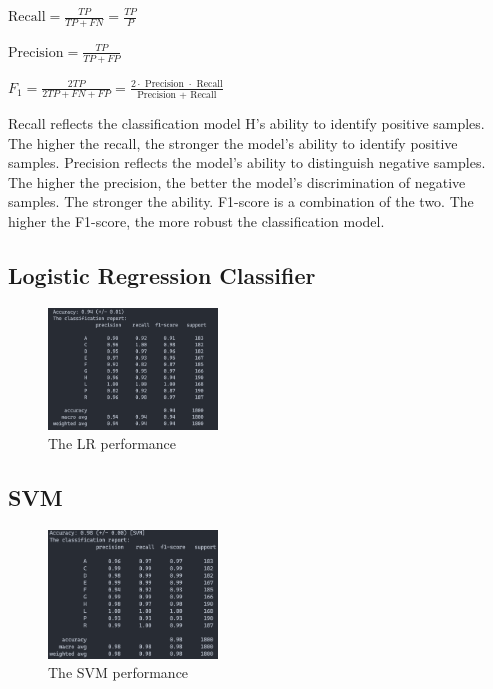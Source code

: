 \documentclass[11pt,en]{elegantpaper}
\begin{document}
$\text{Recall}=\frac{TP}{TP+FN}=\frac{TP}{P}$

$\text{Precision}=\frac{TP}{TP+FP}$

$F_1=\frac{2 T P}{2 T P+F N+F P}=\frac{2 \cdot \text { Precision } \cdot \text { Recall}}{\text {Precision }+\text { Recall}}$

Recall reflects the classification model H's ability to identify positive samples. The higher the recall, the stronger the model's ability to identify positive samples. Precision reflects the model's ability to distinguish negative samples. The higher the precision, the better the model's discrimination of negative samples. The stronger the ability. F1-score is a combination of the two. The higher the F1-score, the more robust the classification model. 

\subsection*{Logistic Regression Classifier}
\begin{figure}[H]
	\centering
	\includegraphics[width=0.4\textwidth]{image/lrpf}
	\caption{The LR performance}
	\label{lrpf}
\end{figure}

\subsection*{SVM}
\begin{figure}[H]
	\centering
	\includegraphics[width=0.4\textwidth]{image/svmpf}
	\caption{The SVM performance}
	\label{svmpf}
\end{figure}
\end{document}
